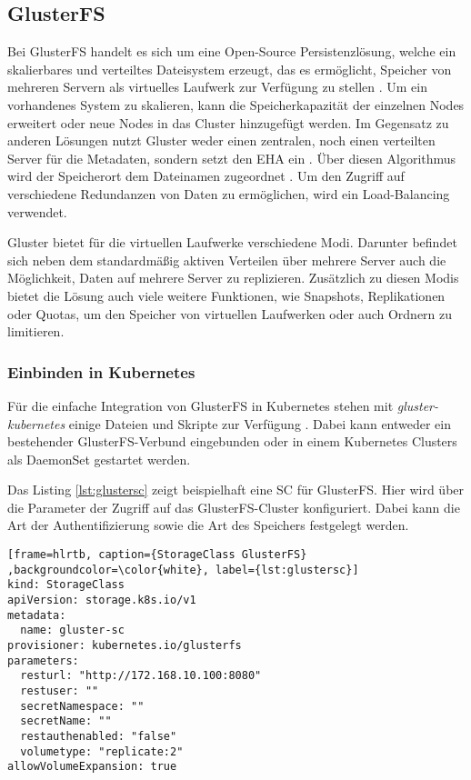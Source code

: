 \subsection{GlusterFS}
\label{subsec:gluster}
Bei GlusterFS handelt es sich um eine Open-Source Persistenzlösung, welche ein skalierbares und verteiltes Dateisystem erzeugt, das es ermöglicht, Speicher von mehreren Servern als virtuelles Laufwerk zur Verfügung zu stellen \cite{Bertsche2018ClusterPostgreSQL}. Um ein vorhandenes System zu skalieren, kann die Speicherkapazität der einzelnen Nodes erweitert oder neue Nodes in das Cluster hinzugefügt werden. Im Gegensatz zu anderen Lösungen nutzt Gluster weder einen zentralen, noch einen verteilten Server für die Metadaten, sondern setzt den \ac{EHA} ein \cite{GlusterCloudArchitecture2}. Über diesen Algorithmus wird der Speicherort dem Dateinamen zugeordnet \cite{Peddemors2010SurveyStorage}. Um den Zugriff auf verschiedene Redundanzen von Daten zu ermöglichen, wird ein Load-Balancing verwendet. \medskip

Gluster bietet für die virtuellen Laufwerke verschiedene Modi. Darunter befindet sich neben dem standardmäßig aktiven Verteilen über mehrere Server auch die Möglichkeit, Daten auf mehrere Server zu replizieren. Zusätzlich zu diesen Modis bietet die Lösung auch viele weitere Funktionen, wie Snapshots, Replikationen oder Quotas, um den Speicher von virtuellen Laufwerken oder auch Ordnern zu limitieren.

\subsubsection{Einbinden in Kubernetes}
Für die einfache Integration von GlusterFS in Kubernetes stehen mit \textit{gluster-kubernetes} einige Dateien und Skripte zur Verfügung \cite{gluster-kubernetes}. Dabei kann entweder ein bestehender GlusterFS-Verbund eingebunden oder in einem Kubernetes Clusters als DaemonSet gestartet werden. \medskip

Das Listing \ref{lst:glustersc} zeigt beispielhaft eine \ac{SC} für GlusterFS. Hier wird über die Parameter der Zugriff auf das GlusterFS-Cluster konfiguriert. Dabei kann die Art der Authentifizierung sowie die Art des Speichers festgelegt werden.
\lstset{language=yaml}
\begin{lstlisting}[frame=hlrtb, caption={StorageClass GlusterFS} ,backgroundcolor=\color{white}, label={lst:glustersc}]
kind: StorageClass
apiVersion: storage.k8s.io/v1
metadata:
  name: gluster-sc
provisioner: kubernetes.io/glusterfs
parameters:
  resturl: "http://172.168.10.100:8080"
  restuser: ""
  secretNamespace: ""
  secretName: ""
  restauthenabled: "false"
  volumetype: "replicate:2"
allowVolumeExpansion: true
\end{lstlisting}

